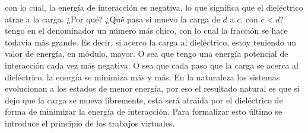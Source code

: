 con lo cual, la energía de interacción es negativa, lo que significa que el dieléctrico atrae a la carga. ¿Por qué? ¿Qué pasa si muevo la carga de $d$ a $c$, con $c < d$? tengo en el denominador un número más chico, con lo cual la fracción se hace todavía más grande. Es decir, si acerco la carga al dieléctrico, estoy teniendo un valor de energía, en módulo, mayor. O sea que tengo una energía potencial de interacción cada vez más negativa. O sea que cada paso que la carga se acerca al dieléctrico, la energía se minimiza más y más. En la naturaleza los sistemas evolucionan a los estados de menor energía, por eso el resultado natural es que si dejo que la carga se mueva libremente, esta será atraída por el dieléctrico de forma de minimizar la energía de interacción. Para formalizar esto último se introduce el principio de los trabajos virtuales.


